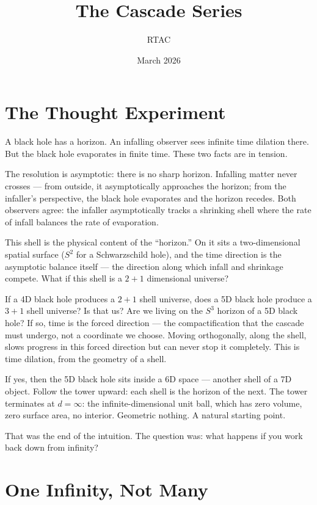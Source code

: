 \documentclass[12pt,a4paper]{article}
\title{\textbf{The Cascade Series}}
\author{RTAC}
\date{March 2026}
\begin{document}
\setlength{\emergencystretch}{3em}
\maketitle
{}
\label{paperdoc}
\thispagestyle{empty}

\section*{The Thought Experiment}

A black hole has a horizon. An infalling observer sees infinite time dilation there.
But the black hole evaporates in finite time. These two facts are in tension.

The resolution is asymptotic: there is no sharp horizon. Infalling matter never
crosses --- from outside, it asymptotically approaches the horizon; from the infaller's
perspective, the black hole evaporates and the horizon recedes. Both observers agree:
the infaller asymptotically tracks a shrinking shell where the rate of infall balances
the rate of evaporation.

This shell is the physical content of the ``horizon.'' On it sits a two-dimensional
spatial surface ($S^2$ for a Schwarzschild hole), and the time direction is the asymptotic
balance itself --- the direction along which infall and shrinkage compete. What if
this shell is a $2 + 1$ dimensional universe?

If a 4D black hole produces a $2 + 1$ shell universe, does a 5D black hole produce
a $3 + 1$ shell universe? Is that us? Are we living on the $S^3$ horizon of a 5D black
hole? If so, time is the forced direction --- the compactification that the cascade
must undergo, not a coordinate we choose. Moving orthogonally, along the shell,
slows progress in this forced direction but can never stop it completely. This is time
dilation, from the geometry of a shell.

If yes, then the 5D black hole sits inside a 6D space --- another shell of a 7D object.
Follow the tower upward: each shell is the horizon of the next. The tower terminates
at $d = \infty$: the infinite-dimensional unit ball, which has zero volume, zero surface
area, no interior. Geometric nothing. A natural starting point.

That was the end of the intuition. The question was: what happens if you work
back down from infinity?

\section*{One Infinity, Not Many}
\end{document}
